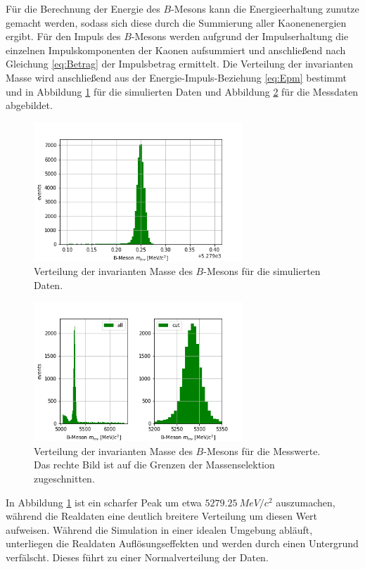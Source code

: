 Für die Berechnung der Energie des $B$-Mesons kann die Energieerhaltung zunutze gemacht werden, sodass sich diese durch die Summierung aller Kaonenenergien ergibt. Für den Impuls des $B$-Mesons werden aufgrund der Impulserhaltung die einzelnen Impulskomponenten der Kaonen aufsummiert und anschließend nach Gleichung \eqref{eq:Betrag} der Impulsbetrag ermittelt.
Die Verteilung der invarianten Masse wird anschließend aus der Energie-Impuls-Beziehung \eqref{eq:Epm} bestimmt und in Abbildung \ref{fig:Minv_sim} für die simulierten Daten und Abbildung \ref{fig:Minv_real} für die Messdaten abgebildet.
\begin{figure}
  \centering
  \includegraphics[width=0.7\textwidth]{plots/sim_Bmes_M.png}
  \caption{Verteilung der invarianten Masse des $B$-Mesons für die simulierten Daten.}
  \label{fig:Minv_sim}
\end{figure} 
\begin{figure}
  \centering
  \includegraphics[width=0.7\textwidth]{plots/real_Bmes_M.png}
  \caption{Verteilung der invarianten Masse des $B$-Mesons für die Messwerte. Das rechte Bild ist auf die Grenzen der Massenselektion zugeschnitten.}
  \label{fig:Minv_real}
\end{figure} 
\FloatBarrier
In Abbildung \ref{fig:Minv_sim} ist ein scharfer Peak um etwa $\SI{5279.25}{MeV/c^2}$ auszumachen, während die Realdaten eine deutlich breitere Verteilung um diesen Wert aufweisen. Während die Simulation in einer idealen Umgebung abläuft, unterliegen die Realdaten Auflösungseffekten und werden durch einen Untergrund verfälscht. Dieses führt zu einer Normalverteilung der Daten.

